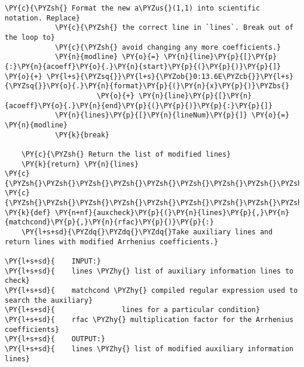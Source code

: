 \begin{Verbatim}[commandchars=\\\{\}]
            \PY{c}{\PYZsh{} Format the new a\PYZus{}(1,1) into scientific notation. Replace}
            \PY{c}{\PYZsh{} the correct line in `lines`. Break out of the loop to}
            \PY{c}{\PYZsh{} avoid changing any more coefficients.}
            \PY{n}{modline} \PY{o}{=} \PY{n}{line}\PY{p}{[}\PY{p}{:}\PY{n}{acoeff}\PY{o}{.}\PY{n}{start}\PY{p}{(}\PY{p}{)}\PY{p}{]} \PY{o}{+} \PY{l+s}{\PYZsq{}}\PY{l+s}{\PYZob{}0:13.6E\PYZcb{}}\PY{l+s}{\PYZsq{}}\PY{o}{.}\PY{n}{format}\PY{p}{(}\PY{n}{x}\PY{p}{)}\PYZbs{}
                      \PY{o}{+} \PY{n}{line}\PY{p}{[}\PY{n}{acoeff}\PY{o}{.}\PY{n}{end}\PY{p}{(}\PY{p}{)}\PY{p}{:}\PY{p}{]}
            \PY{n}{lines}\PY{p}{[}\PY{n}{lineNum}\PY{p}{]} \PY{o}{=} \PY{n}{modline}
            \PY{k}{break}

    \PY{c}{\PYZsh{} Return the list of modified lines}
    \PY{k}{return} \PY{n}{lines}
\PY{c}{\PYZsh{}\PYZsh{}\PYZsh{}\PYZsh{}\PYZsh{}\PYZsh{}\PYZsh{}\PYZsh{}\PYZsh{}\PYZsh{}\PYZsh{}\PYZsh{}\PYZsh{}\PYZsh{}\PYZsh{}\PYZsh{}\PYZsh{}\PYZsh{}\PYZsh{}\PYZsh{}\PYZsh{}\PYZsh{}\PYZsh{}\PYZsh{}\PYZsh{}\PYZsh{}\PYZsh{}\PYZsh{}\PYZsh{}\PYZsh{}\PYZsh{}\PYZsh{}\PYZsh{}\PYZsh{}\PYZsh{}\PYZsh{}\PYZsh{}\PYZsh{}\PYZsh{}\PYZsh{}\PYZsh{}\PYZsh{}\PYZsh{}\PYZsh{}\PYZsh{}\PYZsh{}\PYZsh{}\PYZsh{}\PYZsh{}\PYZsh{}\PYZsh{}\PYZsh{}\PYZsh{}\PYZsh{}\PYZsh{}\PYZsh{}\PYZsh{}\PYZsh{}\PYZsh{}\PYZsh{}\PYZsh{}\PYZsh{}\PYZsh{}\PYZsh{}\PYZsh{}\PYZsh{}\PYZsh{}\PYZsh{}\PYZsh{}\PYZsh{}\PYZsh{}\PYZsh{}\PYZsh{}\PYZsh{}\PYZsh{}\PYZsh{}\PYZsh{}\PYZsh{}\PYZsh{}}
\PY{c}{\PYZsh{}\PYZsh{}\PYZsh{}\PYZsh{}\PYZsh{}\PYZsh{}\PYZsh{}\PYZsh{}\PYZsh{}\PYZsh{}\PYZsh{}\PYZsh{}\PYZsh{}\PYZsh{}\PYZsh{}\PYZsh{}\PYZsh{}\PYZsh{}\PYZsh{}\PYZsh{}\PYZsh{}\PYZsh{}\PYZsh{}\PYZsh{}\PYZsh{}\PYZsh{}\PYZsh{}\PYZsh{}\PYZsh{}\PYZsh{}\PYZsh{}\PYZsh{}\PYZsh{}\PYZsh{}\PYZsh{}\PYZsh{}\PYZsh{}\PYZsh{}\PYZsh{}\PYZsh{}\PYZsh{}\PYZsh{}\PYZsh{}\PYZsh{}\PYZsh{}\PYZsh{}\PYZsh{}\PYZsh{}\PYZsh{}\PYZsh{}\PYZsh{}\PYZsh{}\PYZsh{}\PYZsh{}\PYZsh{}\PYZsh{}\PYZsh{}\PYZsh{}\PYZsh{}\PYZsh{}\PYZsh{}\PYZsh{}\PYZsh{}\PYZsh{}\PYZsh{}\PYZsh{}\PYZsh{}\PYZsh{}\PYZsh{}\PYZsh{}\PYZsh{}\PYZsh{}\PYZsh{}\PYZsh{}\PYZsh{}\PYZsh{}\PYZsh{}\PYZsh{}\PYZsh{}}
\PY{k}{def} \PY{n+nf}{auxcheck}\PY{p}{(}\PY{n}{lines}\PY{p}{,}\PY{n}{matchcond}\PY{p}{,}\PY{n}{rfac}\PY{p}{)}\PY{p}{:}
    \PY{l+s+sd}{\PYZdq{}\PYZdq{}\PYZdq{}Take auxiliary lines and return lines with modified Arrhenius coefficients.}

\PY{l+s+sd}{    INPUT:}
\PY{l+s+sd}{    lines \PYZhy{} list of auxiliary information lines to check}
\PY{l+s+sd}{    matchcond \PYZhy{} compiled regular expression used to search the auxiliary}
\PY{l+s+sd}{                lines for a particular condition}
\PY{l+s+sd}{    rfac \PYZhy{} multiplication factor for the Arrhenius coefficients}
\PY{l+s+sd}{    OUTPUT:}
\PY{l+s+sd}{    lines \PYZhy{} list of modified auxiliary information lines}


\end{Verbatim}
